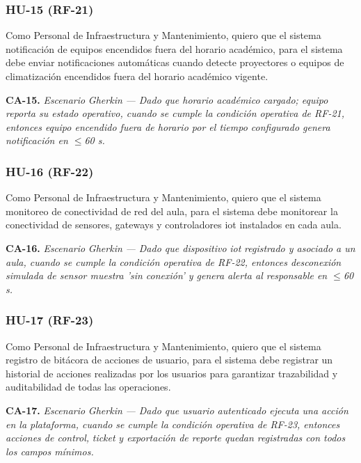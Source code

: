 \subsubsection*{HU-15 (RF-21)}


Como Personal de Infraestructura y Mantenimiento, quiero que el sistema notificación de equipos encendidos fuera del horario académico, para el sistema debe enviar notificaciones automáticas cuando detecte proyectores o equipos de climatización encendidos fuera del horario académico vigente.


\textbf{CA-15.} \textit{Escenario }\textit{Gherkin}\textit{ --- Dado que horario académico cargado; equipo reporta su estado operativo, cuando se cumple la condición operativa de RF-21, entonces equipo encendido fuera de horario por el tiempo configurado genera notificación en $\leq$60 s.}


\subsubsection*{HU-16 (RF-22)}


Como Personal de Infraestructura y Mantenimiento, quiero que el sistema monitoreo de conectividad de red del aula, para el sistema debe monitorear la conectividad de sensores, gateways y controladores iot instalados en cada aula.


\textbf{CA-16.} \textit{Escenario }\textit{Gherkin}\textit{ --- Dado que dispositivo }\textit{iot}\textit{ registrado y asociado a un aula, cuando se cumple la condición operativa de RF-22, entonces desconexión simulada de sensor muestra 'sin conexión' y genera alerta al responsable en $\leq$60 s.}


\subsubsection*{HU-17 (RF-23)}


Como Personal de Infraestructura y Mantenimiento, quiero que el sistema registro de bitácora de acciones de usuario, para el sistema debe registrar un historial de acciones realizadas por los usuarios para garantizar trazabilidad y auditabilidad de todas las operaciones.


\textbf{CA-17.} \textit{Escenario }\textit{Gherkin}\textit{ --- Dado que usuario autenticado ejecuta una acción en la plataforma, cuando se cumple la condición operativa de RF-23, entonces acciones de control, }\textit{ticket}\textit{ y exportación de reporte quedan registradas con todos los campos mínimos.}


